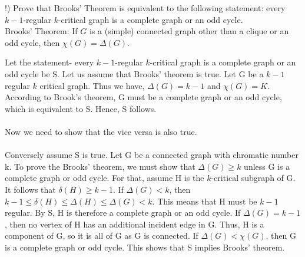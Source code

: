 \documentclass[12pt]{article}
\newenvironment{question}[2][Question]{\begin{trivlist}
\item[\hskip \labelsep {\bfseries #1}\hskip \labelsep {\bfseries #2.}]}{\end{trivlist}}
\begin{document}
\begin{question}{5}
(!) Prove that Brooks' Theorem is equivalent to the following statement: every $k-1$-regular $k$-critical graph is a complete graph or an odd cycle.\\

Brooks' Theorem:
If $G$ is a (simple) connected graph other than a clique or an odd cycle, then $\chi(G) = \Delta(G)$.

Let the statement- every $k-1$-regular $k$-critical graph is a complete graph or an odd cycle be S. Let us assume that Brooks' theorem is true.
Let G be a $k-1$ regular $k$ critical graph. Thus we have, $\Delta (G) = k-1$ and $\chi (G) = K$. According to Brook's theorem, G must be a complete graph or an odd cycle, which is equivalent to S. Hence, S follows. \\ \\
Now we need to show that the vice versa is also true. \\ \\
Conversely assume S is true. Let G be a connected graph with chromatic number k. To prove the Brooks' theorem, we must show that $\Delta(G) \geq k$ unless G is a complete graph or odd cycle. For that, assume H is the $k$-critical subgraph of G. It follows that $\delta (H) \geq k-1$. If $\Delta(G) < k$, then $k- 1 \leq \delta(H) \leq \Delta(H) \leq \Delta(G) < k$. This means that H must be $k-1$ regular. By S, H is therefore a complete graph or an odd cycle. If $\Delta(G)  = k-1$, then no vertex of H has an additional incident edge in G. Thus, H is a component of G, so it is all of G as G is connected. If $\Delta (G) < \chi (G)$, then G is a complete graph or odd cycle. This shows that S implies Brooks' theorem.
\end{question}





\end{document}
